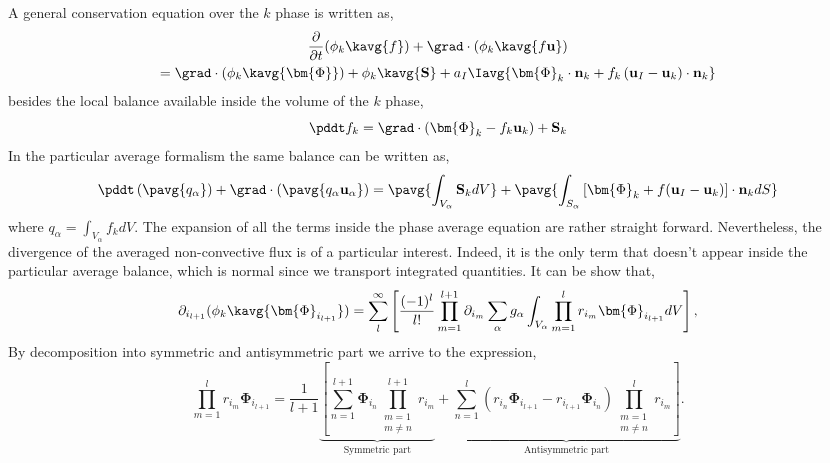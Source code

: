 A general conservation equation over the $k$ phase is written as, 
\begin{multline}
    \frac{\partial}{\partial t} (\phi_k\kavg{f})
    + \grad \cdot \left(
        \phi_k \kavg{f \textbf{u}}
    \right)\\
    = \grad \cdot \left(
        \phi_k \kavg{\bm{\Phi}}
    \right)
    + \phi_k \kavg{\textbf{S}}
    + a_I \Iavg{
        \bm{\Phi}_k \cdot \textbf{n}_k
        + f_k 
        \left(
            \textbf{u}_I
            - \textbf{u}_k
        \right) \cdot \textbf{n}_k
    } 
\label{ap:eq:avg_k_global}
\end{multline}
besides the local balance available inside the volume of the $k$ phase,
\begin{equation}
    \pddt f_k
    = \grad \cdot \left(
        \bm{\Phi}_k
        - f_k\textbf{u}_k
        \right)
    + \textbf{S}_k
\end{equation}
In the particular average formalism the same balance can be written as, 
\begin{equation}
    \pddt   \left(\pavg{q_\alpha}\right)
    + \grad \cdot \left(\pavg{q_\alpha \textbf{u}_\alpha}\right)
    = \pavg{\int_{V_\alpha} \textbf{S}_k dV }
    + \pavg{\int_{S_\alpha} \left[\bm{\Phi}_k + f (\textbf{u}_I-\textbf{u}_k) \right] \cdot \textbf{n}_k d S}
\end{equation}
where $q_\alpha = \int_{V_\alpha} f_k dV$.
The expansion of all the terms inside the phase average equation are rather straight forward.
Nevertheless, the divergence of the averaged non-convective flux is of a particular interest. 
Indeed, it is the only term that doesn't appear inside the particular average balance, which is normal since we transport integrated quantities.
It can be show that, 
\begin{equation}
    \partial_{i_{l+1}}
    (\phi_k \kavg{\bm{\Phi}_{i_{l+1}}})=
    \sum_l^\infty
    \left[
        \frac{(-1)^{l}}{l!}
        \prod^{l+1}_{m=1}
        \partial_{i_m}
        \sum_{\alpha}
        g_{\alpha}
        \int_{V_\alpha}
        \prod^{l}_{m=1}
        r_{i_m} \bm{\Phi}_{i_{l+1}}dV
    \right],
\end{equation}
By decomposition into symmetric and antisymmetric part we arrive to the expression, 
\begin{equation}
    \prod^{l}_{m=1} r_{i_m} \bm{\Phi}_{i_{l+1}}
    = \frac{1}{l+1}
    \underbrace{\left[
    \sum_{n=1}^{l+1} \bm{\Phi}_{i_{n}}\prod^{l+1}_{\substack{m=1 \\ m \neq n}} r_{i_m} \right.}_{\text{Symmetric part}}
    +\underbrace{\left.\sum_{n=1}^{l} (r_{i_n}\bm{\Phi}_{i_{l+1}} - r_{i_{l+1}}\bm{\Phi}_{i_{n}}) \prod^{l}_{\substack{m=1 \\ m \neq n}} r_{i_m} \right]}_{\text{Antisymmetric part}}.
\end{equation}
